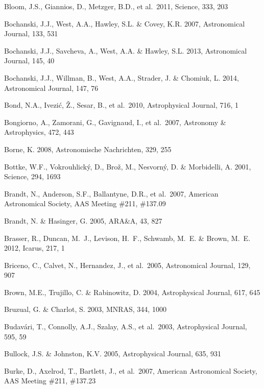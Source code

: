 \documentclass{emulateapj}
\begin{document}
\begin{thebibliography}{}
\bibitem[()]{} Bloom, J.S., Giannios, D., Metzger, B.D., et al.~2011, Science, 333, 203

\bibitem[()]{} Bochanski, J.J., West, A.A., Hawley, S.L. \& Covey, K.R. 2007, Astronomical Journal, 133, 531

\bibitem[()]{} Bochanski, J.J., Savcheva, A., West, A.A. \& Hawley, S.L. 2013, Astronomical Journal, 145, 40

\bibitem[()]{} Bochanski, J.J., Willman, B., West, A.A., Strader, J. \& Chomiuk, L. 2014, Astronomical Journal, 147, 76

\bibitem[()]{} Bond, N.A.,  Ivezi\'{c}, \v{Z}., Sesar, B., et al.~2010, Astrophysical Journal, 716, 1

\bibitem[()]{} Bongiorno, A., Zamorani, G., Gavignaud, I., et al.~2007, Astronomy \& Astrophysics, 472, 443 

\bibitem[()]{} Borne, K. 2008, Astronomische Nachrichten, 329, 255


\bibitem[()]{} Bottke, W.F., Vokrouhlick\'{y}, D., Bro\v{z}, M., Nesvorn\'y, D. \& Morbidelli, A. 2001, 
             Science, 294, 1693

\bibitem[()]{} Brandt, N., Anderson, S.F., Ballantyne, D.R., et al.~2007, American Astronomical 
             Society, AAS Meeting \#211, \#137.09

\bibitem[()]{} Brandt, N. \& Hasinger, G. 2005, ARA\&A, 43, 827

\bibitem[()]{} Brasser, R., Duncan, M.~J., Levison, H.~F., Schwamb, M.~E. \& Brown, M.~E. 2012, Icarus, 217, 1

\bibitem[()]{} Briceno, C., Calvet, N., Hernandez, J., et al.~2005, Astronomical Journal, 129, 907

\bibitem[()]{} Brown, M.E., Trujillo, C. \& Rabinowitz, D. 2004, Astrophysical Journal, 617, 645

\bibitem[()]{} Bruzual, G. \& Charlot, S. 2003, MNRAS, 344, 1000

\bibitem[()]{} Budav\'{a}ri, T., Connolly, A.J., Szalay, A.S., et al.~2003, Astrophysical Journal, 595, 59

\bibitem[()]{} Bullock, J.S. \& Johnston, K.V. 2005,  Astrophysical Journal, 635, 931

\bibitem[()]{} Burke, D., Axelrod, T., Bartlett, J., et al.~2007, 
                      American Astronomical Society, AAS Meeting \#211, \#137.23
                      

\end{thebibliography}
\end{document}
